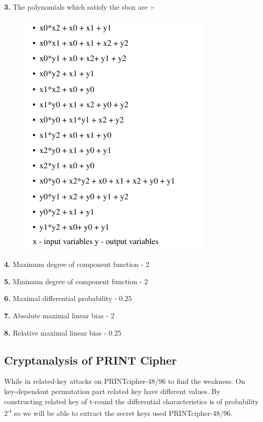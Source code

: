 \documentclass[journal=tosc,preprint]{iacrtrans}
\begin{document}
\noindent\textbf{3. } The polynomials which satisfy the sbox are :-
\begin{figure}[ht]
	\includegraphics{pics/polynomials.png}
\end{figure}

\noindent\textbf{4.} Maximum degree of component function - 2\newline

\noindent\textbf{5.} Minimum degree of component function - 2\newline

\noindent\textbf{6.} Maximal differential probability - 0.25\newline

\noindent\textbf{7.} Absolute maximal linear bias - 2\newline

\noindent\textbf{8.} Relative maximal linear bias - 0.25\newline

\subsection{Cryptanalysis of PRINT Cipher}


While in related-key attacks on PRINTcipher-48/96 to find the weakness. On key-dependent permutation part related key have different values. By constructing related key of t-round the differential characteristics is of probability 2\textsuperscript{-t} so we will be able to extract the secret keys used PRINTcipher-48/96. 
\end{document}
